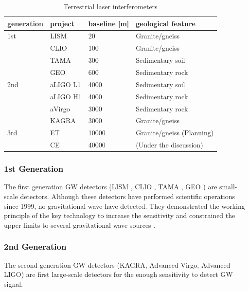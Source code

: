 \begin{table}[h] 
  \begin{center}
    \caption{Terrestrial laser interferometers \cite{chen2017brief,beker2013low}}\label{tb:tb101}
    \begin{tabular}{llll} 
      \hline
      generation &project & baseline [m] & geological feature \\ \hline \hline
      1st &LISM  & 20    & Granite/gneiss \\ 
      &CLIO  & 100   & Granite/gneiss \\
      &TAMA  & 300   & Sedimentary soil \cite{1970449}\\ 
      &GEO   & 600   & Sedimentary rock \\ \hline
      2nd &aLIGO L1 & 4000  & Sedimentary soil \\
      &aLIGO H1 & 4000  & Sedimentary rock \\
      &aVirgo   & 3000  & Sedimentary rock \\
      &KAGRA   & 3000  & Granite/gneiss \\ \hline
      3rd &ET      & 10000 & Granite/gneiss (Planning) \\
          &CE      & 40000 & (Under the discussion) \\
      \hline
    \end{tabular}
  \end{center}
\end{table}


\subsubsection{1st Generation}
The first generation GW detectors (LISM \cite{sato2004ultrastable}, CLIO \cite{ohashi2003design}, TAMA \cite{ando2001stable}, GEO \cite{grote2010geo}) are small-scale detectors. Although these detectors have performed scientific operations since 1999, no gravitational wave have detected. They demonstrated the working principle of the key technology to increase the sensitivity and constrained the upper limits to several gravitational wave sources \cite{takahashi2004coincidence,Fairhurst2011}.

\subsubsection{2nd Generation}
The second generation GW detectors (KAGRA\cite{akutsu2018kagra}, Advanced Virgo\cite{acernese2014advanced}, Advanced LIGO\cite{aasi2015advanced}) are first large-scale detectors for the enough sensitivity to detect GW signal.

